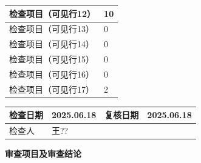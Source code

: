\documentclass[UTF8,10pt,a4paper,fontset=fandol]{ctexart}
\newcommand{\fieldvalue}[1]{#1}
\newcommand{\handwritten}[1]{#1}
\begin{document}
\begin{tabularx}{\textwidth}{|X|p{}|}
检查项目（可见行12） &
\fieldvalue{\handwritten{10}} \\ \hline

检查项目（可见行13） &
\fieldvalue{\handwritten{0}} \\ \hline

检查项目（可见行14） &
\fieldvalue{\handwritten{0}} \\ \hline

检查项目（可见行15） &
\fieldvalue{\handwritten{0}} \\ \hline

检查项目（可见行16） &
\fieldvalue{\handwritten{0}} \\ \hline

检查项目（可见行17） &
\fieldvalue{\handwritten{2}} \\ \hline
\end{tabularx}

\vspace{0.75em}

\begin{tabularx}{\textwidth}{|p{}|X|p{}|X|}
\hline
检查日期 &
\fieldvalue{\handwritten{2025.06.18}} &
复核日期 &
\fieldvalue{\handwritten{2025.06.18}} \\ \hline
检查人 &
\fieldvalue{\handwritten{王??}} &
\multicolumn{2}{c|}{} \\ \hline
\end{tabularx}


\newpage

\begin{center}
\textbf{审查项目及审查结论}
\end{center}
\end{document}
